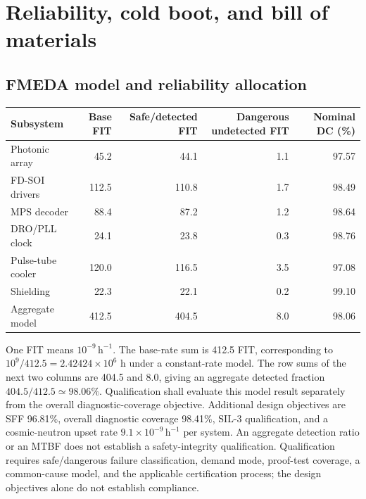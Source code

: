 \documentclass[11pt,a4paper]{article}
\newcommand{\unit}[1]{\,\mathrm{#1}}
\begin{document}
\section{Reliability, cold boot, and bill of materials}
\subsection{FMEDA model and reliability allocation}
\begin{center}\small
\begin{tabular}{@{}lrrrr@{}}\toprule
Subsystem & Base FIT & Safe/detected FIT & Dangerous undetected FIT & Nominal DC (\%)\\\midrule
Photonic array & 45.2 & 44.1 & 1.1 & 97.57\\
FD-SOI drivers & 112.5 & 110.8 & 1.7 & 98.49\\
MPS decoder & 88.4 & 87.2 & 1.2 & 98.64\\
DRO/PLL clock & 24.1 & 23.8 & 0.3 & 98.76\\
Pulse-tube cooler & 120.0 & 116.5 & 3.5 & 97.08\\
Shielding & 22.3 & 22.1 & 0.2 & 99.10\\\midrule
Aggregate model & 412.5 & 404.5 & 8.0 & 98.06\\\bottomrule
\end{tabular}\end{center}
One FIT means $10^{-9}\unit{h^{-1}}$. The base-rate sum is 412.5 FIT, corresponding to
$10^9/412.5=2.42424\times10^6$ h under a constant-rate model. The row sums of the next
two columns are 404.5 and 8.0, giving an aggregate detected fraction
$404.5/412.5\simeq98.06\%$. Qualification shall evaluate this model result
separately from the overall diagnostic-coverage objective.
Additional design objectives are SFF 96.81\%, overall diagnostic coverage 98.41\%,
SIL-3 qualification, and a cosmic-neutron upset rate $9.1\times10^{-9}\unit{h^{-1}}$ per system.
An aggregate detection ratio or an MTBF does not establish a safety-integrity qualification.
Qualification requires safe/dangerous failure classification, demand mode, proof-test
coverage, a common-cause model, and the applicable certification process; the design
objectives alone do not establish compliance.
\end{document}
